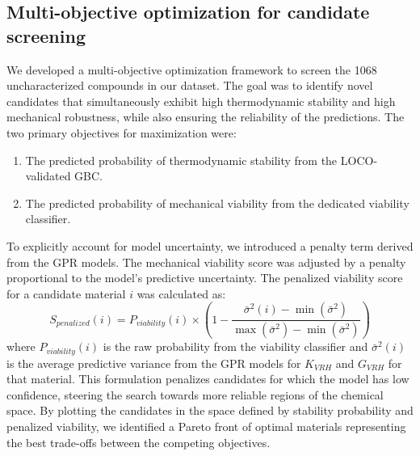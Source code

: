 \documentclass[]{article}
\begin{document}
\subsection{Multi-objective optimization for candidate screening}
We developed a multi-objective optimization framework to screen the 1068 uncharacterized compounds in our dataset. The goal was to identify novel candidates that simultaneously exhibit high thermodynamic stability and high mechanical robustness, while also ensuring the reliability of the predictions. The two primary objectives for maximization were:
\begin{enumerate}
    \item The predicted probability of thermodynamic stability from the LOCO-validated GBC.
    \item The predicted probability of mechanical viability from the dedicated viability classifier.
\end{enumerate}
To explicitly account for model uncertainty, we introduced a penalty term derived from the GPR models. The mechanical viability score was adjusted by a penalty proportional to the model's predictive uncertainty. The penalized viability score for a candidate material $i$ was calculated as:
\begin{equation}
    S_{penalized}(i) = P_{viability}(i) \times \left(1 - \frac{\bar{\sigma}^2(i) - \min(\bar{\sigma}^2)}{\max(\bar{\sigma}^2) - \min(\bar{\sigma}^2)}\right)
\end{equation}
where $P_{viability}(i)$ is the raw probability from the viability classifier and $\bar{\sigma}^2(i)$ is the average predictive variance from the GPR models for $K_{VRH}$ and $G_{VRH}$ for that material. This formulation penalizes candidates for which the model has low confidence, steering the search towards more reliable regions of the chemical space. By plotting the candidates in the space defined by stability probability and penalized viability, we identified a Pareto front of optimal materials representing the best trade-offs between the competing objectives.
\end{document}
